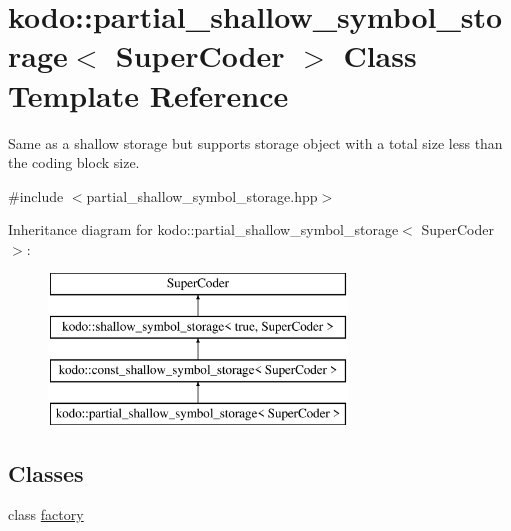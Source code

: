 \hypertarget{classkodo_1_1partial__shallow__symbol__storage}{\section{kodo\-:\-:partial\-\_\-shallow\-\_\-symbol\-\_\-storage$<$ Super\-Coder $>$ Class Template Reference}
\label{classkodo_1_1partial__shallow__symbol__storage}
}


Same as a shallow storage but supports storage object with a total size less than the coding block size.  




{\ttfamily \#include $<$partial\-\_\-shallow\-\_\-symbol\-\_\-storage.\-hpp$>$}

Inheritance diagram for kodo\-:\-:partial\-\_\-shallow\-\_\-symbol\-\_\-storage$<$ Super\-Coder $>$\-:\begin{figure}[H]
\begin{center}
\leavevmode
\includegraphics[height=4.000000cm]{classkodo_1_1partial__shallow__symbol__storage}
\end{center}
\end{figure}
\subsection*{Classes}
\begin{DoxyCompactItemize}
\item 
class \hyperlink{classkodo_1_1partial__shallow__symbol__storage_1_1factory}{factory}
\end{DoxyCompactItemize}
